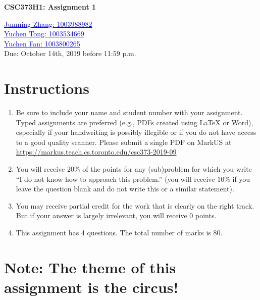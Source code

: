 \documentclass[10pt]{article}
\begin{document}
\begin{center}
\Large \textbf{CSC373H1: Assignment 1}

\vspace{1mm}
\large {\href{mailto:junmingpeter.zhang@mail.utoronto.ca?Subject=CSC373H1: Assignment 1}{\textcolor{blue}{Junming Zhang: 1003988982}}\\
        \href{mailto:yuchen.tong@mail.utoronto.ca?Subject=CSC373H1: Assignment 1}{\textcolor{blue}{Yuchen Tong: 1003534669}}\\
        \href{mailto:yuchen.fan@mail.utoronto.ca?Subject=CSC373H1: Assignment 1}{\textcolor{blue}{Yuchen Fan: 1003800265}}}\\

\vspace{1mm}
\large {Due: October 14th, 2019 before 11:59 p.m.}
\end{center}
\section*{Instructions}
\begin{enumerate}
    \item Be sure to include your name and student number with your assignment. Typed assignments are preferred (e.g., PDFs created using LaTeX or Word), especially if your handwriting is possibly illegible or if you do not have access to a good quality scanner. Please submit a single PDF on MarkUS at \url{https://markus.teach.cs.toronto.edu/csc373-2019-09}
    \item You will receive $20\%$ of the points for any (sub)problem for which you write “I do not know how to approach this problem.” (you will receive $10\%$ if you leave the question blank and do not write this or a similar statement).
    \item You may receive partial credit for the work that is clearly on the right track. But if your answer is largely irrelevant, you will receive 0 points.
    \item This assignment has 4 questions. The total number of marks is 80.
\end{enumerate}

\section*{Note: The theme of this assignment is the circus!}
\end{document}
